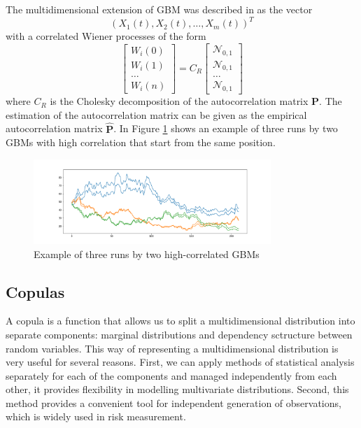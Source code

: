 \documentclass{article}
\begin{document}
The multidimensional extension of GBM was described in \cite{sabino2007monte} as the vector $$(X_1(t), X_2(t), \dots, X_m(t))^T$$ with a correlated Wiener processes of the form
\begin{equation*}
\begin{bmatrix}
    W_i(0)\\
    W_i(1)\\
    \dots \\
    W_i(n)
\end{bmatrix} = C_R \begin{bmatrix}
    \mathcal{N}_{0, 1}\\
    \mathcal{N}_{0, 1}\\
    \dots\\
    \mathcal{N}_{0, 1}
\end{bmatrix}
\end{equation*}
where $C_R$ is the Cholesky decomposition of the autocorrelation matrix $\mathbf P$. The estimation of the autocorrelation matrix can be given as the empirical autocorrelation matrix $\hat {\mathbf P}$. In Figure \ref{fig:gbm1} shows an example of three runs by two GBMs with high correlation that start from the same position.

\begin{figure}[h]
    \centering
    \includegraphics[width=0.8\textwidth]{pics/gbm.png}
    \caption{Example of three runs by two high-correlated GBMs}
    \label{fig:gbm1}
\end{figure}

\subsection{Copulas}
\label{section:copulas}

A copula is a function that allows us to split a multidimensional distribution into separate components: marginal distributions and dependency sctructure between random variables. This way of representing a multidimensional distribution is very useful for several reasons. First, we can apply methods of statistical analysis separately for each of the components and managed independently from each other, it provides flexibility in modelling multivariate distributions. Second, this method provides a convenient tool for independent generation of observations, which is widely used in risk measurement.
\end{document}
